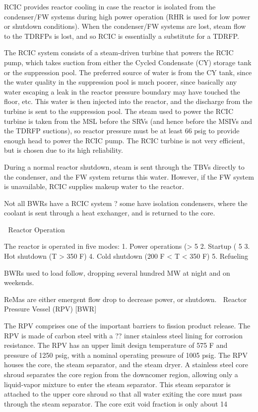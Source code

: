 \documentclass[10pt]{article}
\begin{document}
RCIC provides reactor cooling in case the reactor is isolated from the condenser/FW systems during high power operation (RHR is used for low power or shutdown conditions). When the condenser/FW systems are lost, steam flow to the TDRFPs is lost, and so RCIC is essentially a substitute for a TDRFP. 

The RCIC system consists of a steam-driven turbine that powers the RCIC pump, which takes suction from either the Cycled Condensate (CY) storage tank or the suppression pool. The preferred source of water is from the CY tank, since the water quality in the suppression pool is much poorer, since basically any water escaping a leak in the reactor pressure boundary may have touched the floor, etc. This water is then injected into the reactor, and the discharge from the turbine is sent to the suppression pool. The steam used to power the RCIC turbine is taken from the MSL before the SRVs (and hence before the MSIVs and the TDRFP suctions), so reactor pressure must be at least 66 psig to provide enough head to power the RCIC pump. The RCIC turbine is not very efficient, but is chosen due to its high reliability. 

During a normal reactor shutdown, steam is sent through the TBVs directly to the condenser, and the FW system returns this water. However, if the FW system is unavailable, RCIC supplies makeup water to the reactor. 

Not all BWRs have a RCIC system ? some have isolation condensers, where the coolant is sent through a heat exchanger, and is returned to the core. 


Reactor Operation

The reactor is operated in five modes:
1.	Power operations (> 5%
2.	Startup ( 5%
3.	Hot shutdown (T > 350 F)
4.	Cold shutdown (200 F < T < 350 F)
5.	Refueling

BWRs used to load follow, dropping several hundred MW at night and on weekends. 

ReMas are either emergent flow drop to decrease power, or shutdown. 
Reactor Pressure Vessel (RPV) [BWR]

The RPV comprises one of the important barriers to fission product release. The RPV is made of carbon steel with a ?? inner stainless steel lining for corrosion resistance. The RPV has an upper limit design temperature of 575 F and pressure of 1250 psig, with a nominal operating pressure of 1005 psig. The RPV houses the core, the steam separator, and the steam dryer. A stainless steel core shroud separates the core region from the downcomer region, allowing only a liquid-vapor mixture to enter the steam separator. This steam separator is attached to the upper core shroud so that all water exiting the core must pass through the steam separator. The core exit void fraction is only about 14%
\end{document}
